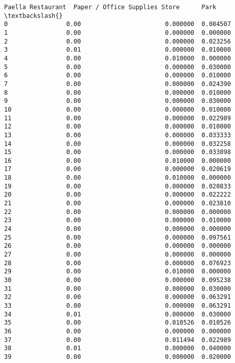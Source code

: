 \documentclass[11pt]{article}
\begin{document}
\begin{tcolorbox}[breakable, size=fbox, boxrule=.5pt, pad at break*=1mm, opacityfill=0]
\begin{Verbatim}[commandchars=\\\{\}]
    Paella Restaurant  Paper / Office Supplies Store      Park  \textbackslash{}
0                0.00                       0.000000  0.084507
1                0.00                       0.000000  0.000000
2                0.00                       0.000000  0.023256
3                0.01                       0.000000  0.010000
4                0.00                       0.010000  0.000000
5                0.00                       0.000000  0.030000
6                0.00                       0.000000  0.010000
7                0.00                       0.000000  0.024390
8                0.00                       0.000000  0.010000
9                0.00                       0.000000  0.030000
10               0.00                       0.000000  0.010000
11               0.00                       0.000000  0.022989
12               0.00                       0.000000  0.010000
13               0.00                       0.000000  0.033333
14               0.00                       0.000000  0.032258
15               0.00                       0.000000  0.033898
16               0.00                       0.010000  0.000000
17               0.00                       0.000000  0.020619
18               0.00                       0.010000  0.000000
19               0.00                       0.000000  0.020833
20               0.00                       0.000000  0.022222
21               0.00                       0.000000  0.023810
22               0.00                       0.000000  0.000000
23               0.00                       0.000000  0.010000
24               0.00                       0.000000  0.000000
25               0.00                       0.000000  0.097561
26               0.00                       0.000000  0.000000
27               0.00                       0.000000  0.000000
28               0.00                       0.000000  0.076923
29               0.00                       0.010000  0.000000
30               0.00                       0.000000  0.095238
31               0.00                       0.000000  0.030000
32               0.00                       0.000000  0.063291
33               0.00                       0.000000  0.063291
34               0.01                       0.000000  0.030000
35               0.00                       0.010526  0.010526
36               0.00                       0.000000  0.000000
37               0.00                       0.011494  0.022989
38               0.01                       0.000000  0.040000
39               0.00                       0.000000  0.020000


\end{Verbatim}
\end{tcolorbox}
\end{document}
